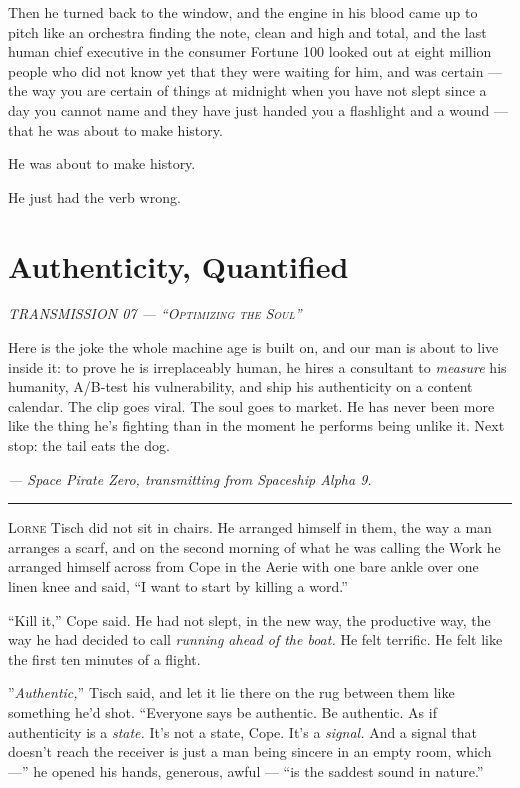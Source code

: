 \documentclass[11pt,openany]{book}
\newcommand{\transheader}{\normalfont\footnotesize\scshape\letterspace}
\newcommand{\letterspace}{}
\newenvironment{transmission}{%
  \par\vspace{0.3\baselineskip}\begin{center}\begin{minipage}{0.88\textwidth}%
  \itshape\small\setlength{\parindent}{0pt}\setstretch{1.06}}%
  {\end{minipage}\end{center}\vspace{0.4\baselineskip}%
  \noindent\hfil\rule{0.35\textwidth}{0.3pt}\hfil\par\vspace{1.0\baselineskip}}
\begin{document}
Then he turned back to the window, and the engine in his blood came up to pitch like an orchestra finding the note, clean and high and total, and the last human chief executive in the consumer Fortune 100 looked out at eight million people who did not know yet that they were waiting for him, and was certain --- the way you are certain of things at midnight when you have not slept since a day you cannot name and they have just handed you a flashlight and a wound --- that he was about to make history.

He was about to make history.

He just had the verb wrong.

\clearpage
\chapter{Authenticity, Quantified}

\begin{transmission}
{\transheader TRANSMISSION 07 --- ``Optimizing the Soul''}\par\vspace{0.5em}
Here is the joke the whole machine age is built on, and our man is about to live inside it: to prove he is irreplaceably human, he hires a consultant to \textit{measure} his humanity, A/B-test his vulnerability, and ship his authenticity on a content calendar. The clip goes viral. The soul goes to market. He has never been more like the thing he's fighting than in the moment he performs being unlike it. Next stop: the tail eats the dog.\par
\vspace{0.5em}\hfill\textit{--- Space Pirate Zero, transmitting from Spaceship Alpha 9.}\par
\end{transmission}


\lettrine[lines=3, lhang=0.05, nindent=0.25em]{L}{orne} Tisch did not sit in chairs. He arranged himself in them, the way a man arranges a scarf, and on the second morning of what he was calling the Work he arranged himself across from Cope in the Aerie with one bare ankle over one linen knee and said, ``I want to start by killing a word.''

``Kill it,'' Cope said. He had not slept, in the new way, the productive way, the way he had decided to call \textit{running ahead of the boat.} He felt terrific. He felt like the first ten minutes of a flight.

''\textit{Authentic,}'' Tisch said, and let it lie there on the rug between them like something he'd shot. ``Everyone says be authentic. Be authentic. As if authenticity is a \textit{state.} It's not a state, Cope. It's a \textit{signal.} And a signal that doesn't reach the receiver is just a man being sincere in an empty room, which ---'' he opened his hands, generous, awful --- ``is the saddest sound in nature.''
\end{document}

